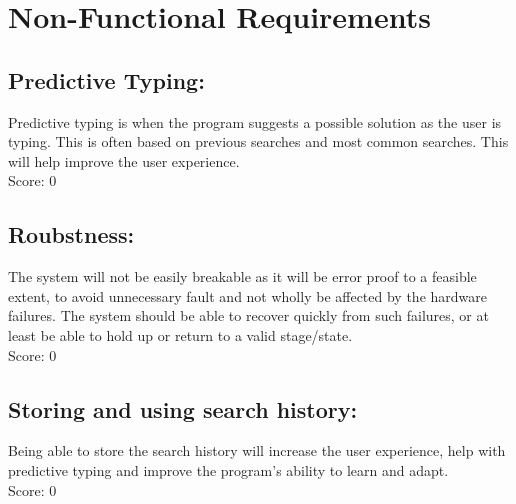 \documentclass[11pt]{article}
\begin{document}
	\section{Non-Functional Requirements}	
	\subsection{Predictive Typing:}
Predictive typing is when the program suggests a possible solution as the user is typing. This is often based on previous searches and most common searches. This will help improve the user experience. \\
    
	Score: 0    
    \subsection{Roubstness:}
The system will not be easily breakable as it will be error proof to a feasible extent, to avoid unnecessary fault and not wholly be affected by the hardware failures. The system should be able to recover quickly from such failures, or at least be able to hold up or return to a valid stage/state.\\
    
	Score: 0    
    \subsection{Storing and using search history:}
	Being able to store the search history will increase the user experience, help with predictive typing and improve the program's ability to learn and adapt.\\

	Score: 0    
        
        \newpage
        
\end{document}
